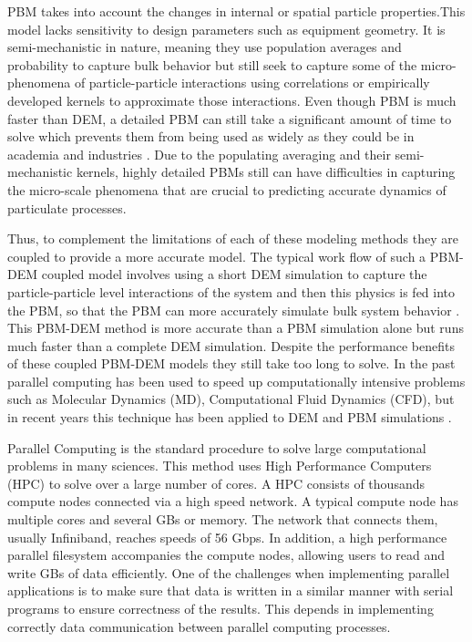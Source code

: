 \documentclass[preprint,11pt,authoryear]{elsarticle}
\begin{document}
PBM takes into account the changes in internal or spatial particle properties.This 
model lacks sensitivity to design parameters such as equipment geometry. It is semi-mechanistic in 
nature, meaning they use population averages and probability to capture bulk behavior but still 
seek to capture some of the micro-phenomena of particle-particle interactions using correlations or 
empirically developed kernels to approximate those interactions. Even though PBM is much faster 
than DEM, a detailed PBM can still take a significant amount of time to solve which prevents them 
from being used as widely as they could be in academia and industries \citep{Barrasso2013}. Due to the 
populating averaging and their semi-mechanistic kernels, highly detailed PBMs still can have 
difficulties in capturing the micro-scale phenomena that are crucial to predicting accurate dynamics of 
particulate processes. 

Thus, to complement the limitations of each of these modeling methods they are coupled to 
provide a more accurate model.  The typical work flow of such a PBM-DEM coupled model involves 
using a short DEM simulation to capture the particle-particle level interactions of the system and 
then this physics is fed into the PBM, so that the PBM can more accurately simulate bulk system 
behavior \citep{Goldschmidt2003} \citep{Reinhold2012}\citep{Barrasso2013}. This PBM-DEM 
method is more accurate than a PBM simulation alone but runs much faster than a complete DEM 
simulation. Despite the performance benefits of these coupled PBM-DEM models they still take too 
long to solve. In the past parallel computing has been used to speed up computationally intensive 
problems such as Molecular Dynamics (MD), Computational Fluid Dynamics (CFD), but in recent 
years  this technique has been applied to DEM and PBM simulations 
\citep{Bettencourt2017}\citep{Prakash2013a}\citep{Gunawan2008}.


Parallel Computing is the standard procedure to solve large computational problems in many sciences. 
This method uses High Performance Computers (HPC) to solve over a large number of cores. 
A HPC consists of thousands compute nodes connected via a high speed network. A typical compute 
node has multiple cores and several GBs or memory. The network that connects them, usually Infiniband, 
reaches speeds of 56 Gbps. In addition, a high performance parallel filesystem accompanies the compute 
nodes, allowing users to read and write GBs of data efficiently. One of the challenges when implementing 
parallel applications is to make sure that data is written in a similar manner with serial programs 
to ensure correctness of the results. This depends in implementing 
correctly data communication between parallel computing processes.
\end{document}

